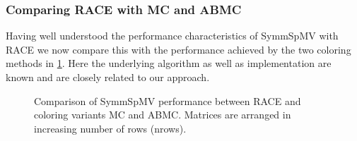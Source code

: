 \subsubsection{Comparing \acrshort{RACE} with \acrshort{MC} and \acrshort{ABMC}}
%
Having well understood the performance characteristics of  \acrshort{SymmSpMV} with \acrshort{RACE} we now compare this with the performance achieved by the two coloring methods in \cref{fig:symm_spmv}. Here the underlying algorithm as well as implementation are known and are closely related to our approach. 
%
\begin{figure}[tbp]
	\centering
	\hspace{1em}
	\caption{Comparison of \acrshort{SymmSpMV} performance between \acrshort{RACE} and coloring variants \acrshort{MC} and \acrshort{ABMC}. Matrices are arranged in increasing number of rows (\acrshort{nrows}).}
	\label{fig:symm_spmv}
\end{figure}
